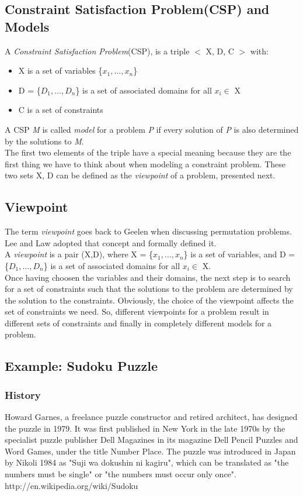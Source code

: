 \documentclass[a4paper]{scrartcl}
\begin{document}
\subsection{Constraint Satisfaction Problem(CSP) and Models}
A {\it Constraint Satisfaction Problem}(CSP), is a triple
$<$ X, D, C $>$ with: 
\begin{itemize}
\item
X is a set of variables \{$x_1, \ldots, x_n$\}
\item
D = \{$ D_1, \ldots, D_n$\} is a set 
of associated domains for all $x_i \in$ X
\item
C is a set of constraints
\end{itemize}
A CSP {\it M} is called {\it model} for a problem {\it P}
if every solution of {\it P} is also determined by
the solutions to {\it M}.\\ 
The first two elements of the triple have a special
meaning because they are the first thing we have to think
about when modeling a constraint problem. These two 
sets X, D can be defined as the {\it viewpoint} of a
problem, presented next.
  
\subsection{Viewpoint}
\label{viewp}
The term {\it viewpoint} goes back to Geelen \cite{6} when
discussing permutation problems. Lee and Law \cite{7} adopted
that concept and formally defined it.\\
A {\it viewpoint} is a pair (X,D), where X = \{$x_1, \ldots, x_n$\} 
is a set of variables, and D = \{$ D_1, \ldots, D_n$\} is a set 
of associated domains for all $x_i \in$ X. \\
Once having choosen the variables and their domains, the next
step is to search for a set of constraints such that the solutions 
to the problem are determined by the solution to the constraints.
Obviously, the choice of the viewpoint affects the set of
constraints we need. So, different viewpoints for a problem
result in different sets of constraints and finally in completely
different models for a problem.
 

\subsection{Example: Sudoku Puzzle}
\label{sudoku-puzzle}
\subsubsection{History}
Howard Garnes, a freelance puzzle constructor and retired architect, has
designed the puzzle in 1979. It was first published in New York in the late 1970s by the specialist puzzle publisher Dell Magazines in its magazine Dell Pencil Puzzles and Word Games, under the title Number Place. 
The puzzle was introduced in Japan by Nikoli 1984 as "Suji wa dokushin ni kagiru", which can be translated as "the numbers must be single" or "the numbers must occur only once".
{http://en.wikipedia.org/wiki/Sudoku}
\end{document}
